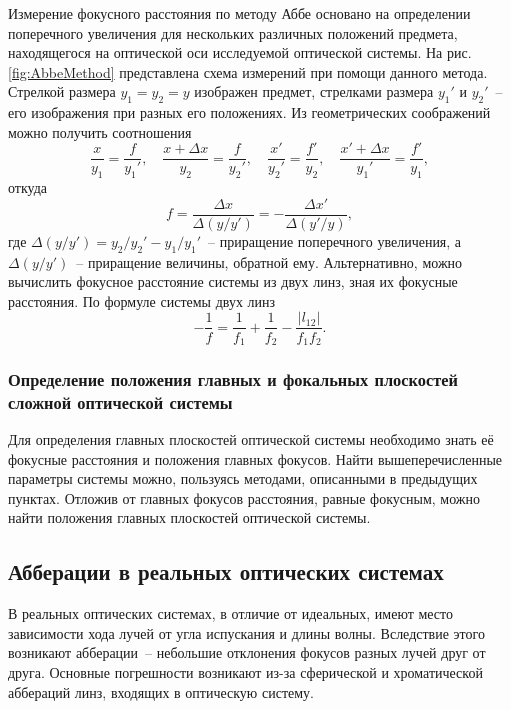 \documentclass[a4paper,12pt]{article} %
\begin{document}
Измерение фокусного расстояния по методу Аббе основано на определении поперечного увеличения для нескольких различных положений предмета, находящегося на оптической оси исследуемой оптической системы. На рис.\,\ref{fig:AbbeMethod} представлена схема измерений при помощи данного метода. Стрелкой размера $y_1=y_2=y$ изображен предмет, стрелками размера $y_1'$ и $y_2'$~-- его изображения при разных его положениях. Из геометрических соображений можно получить соотношения
\begin{equation}
    \frac{x}{y_1}=\frac{f}{y_1'},\quad\frac{x+\Delta x}{y_2}=\frac{f}{y_2'},\quad
    \frac{x'}{y_2'}=\frac{f'}{y_2},\quad\frac{x'+\Delta x}{y_1'}=\frac{f'}{y_1},
\end{equation}
откуда
\begin{equation}\label{AbbeMethod}
    f = \frac{\Delta x}{\Delta(y/y')} = -\frac{\Delta x'}{\Delta(y'/y)},
\end{equation}
где $\Delta(y/y') = y_2/y_2' - y_1/y_1'$~-- приращение поперечного увеличения, а $\Delta(y/y')$~-- приращение величины, обратной ему. Альтернативно, можно вычислить фокусное расстояние системы из двух линз, зная их фокусные расстояния. По формуле системы двух линз
\begin{equation}\label{systemFailureForTheMassesAntimatterForTheMasterplan}
    -\frac{1}{f} = \frac{1}{f_1} + \frac{1}{f_2} - \frac{|l_{12}|}{f_1f_2}.
\end{equation}

\subsubsection*{Определение положения главных и фокальных плоскостей сложной
оптической системы}

Для определения главных плоскостей оптической системы необходимо знать её фокусные расстояния и положения главных фокусов. Найти вышеперечисленные параметры системы можно, пользуясь методами, описанными в предыдущих пунктах. Отложив от главных фокусов расстояния, равные фокусным, можно найти положения главных плоскостей оптической системы.

\subsection{Абберации в реальных оптических системах}

В реальных оптических системах, в отличие от идеальных, имеют место зависимости хода лучей от угла испускания и длины волны. Вследствие этого возникают абберации~-- небольшие отклонения фокусов разных лучей друг от друга. Основные погрешности возникают из-за сферической  и хроматической аббераций линз, входящих в оптическую систему.
\end{document}

